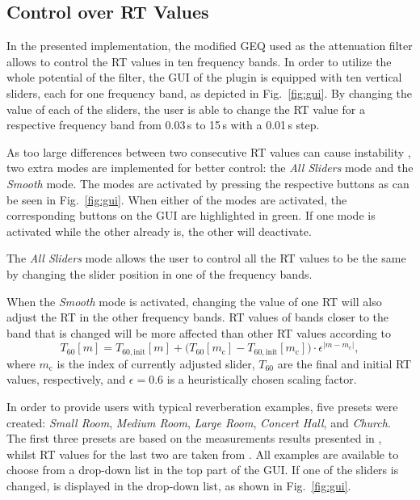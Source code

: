 \documentclass[twoside,a4paper]{article}
\begin{document}



\subsection{Control over RT Values}
In the presented implementation, the modified GEQ used as the attenuation filter allows to control the RT values in ten frequency bands. In order to utilize the whole potential of the filter, the GUI of the plugin is equipped with ten vertical sliders, each for one frequency band, as depicted in Fig.~\ref{fig:gui}. By changing the value of each of the sliders, the user is able to change the RT value for a respective frequency band from 0.03\,s to 15\,s with a 0.01\,s step. 

As too large differences between two consecutive RT values can cause instability \cite{prawda:2019:improved}, two extra modes are implemented for better control: the \textit{All Sliders} mode and the \textit{Smooth} mode. The modes are activated by pressing the respective buttons as can be seen in Fig.~\ref{fig:gui}. When either of the modes are activated, the corresponding buttons on the GUI are highlighted in green. If one mode is activated while the other already is, the other will deactivate.

The \textit{All Sliders} mode allows the user to control all the RT values to be the same by changing the slider position in one of the frequency bands. 

When the \textit{Smooth} mode is activated, changing the value of one RT will also adjust the RT in the other frequency bands. RT values of bands closer to the band that is changed will be more affected than other RT values according to
\begin{equation}
T_{60}[m] = T_{60, \textrm{init}}[m] + \Big(T_{60}[m_\text{c}] - T_{60, \textrm{init}}[m_\text{c}]\Big) \cdot \epsilon^{|m-m_\text{c}|},
\label{eq:smooth}
\end{equation}
%
where $m_\text{c}$ is the index of currently adjusted slider, $T_{60}$  are the final and initial RT values, respectively, and $\epsilon = 0.6$ is a heuristically chosen scaling factor.

In order to provide users with typical reverberation examples, five presets were created: \textit{Small Room}, \textit{Medium Room}, \textit{Large Room}, \textit{Concert Hall}, and \textit{Church}. The first three presets are based on the measurements results presented in \cite{jeub09}, whilst RT values for the last two are taken from \cite{air}. All examples are available to choose from a drop-down list in the top part of the GUI. If one of the sliders is changed,  is displayed in the drop-down list, as shown in Fig.~\ref{fig:gui}.
\end{document}
